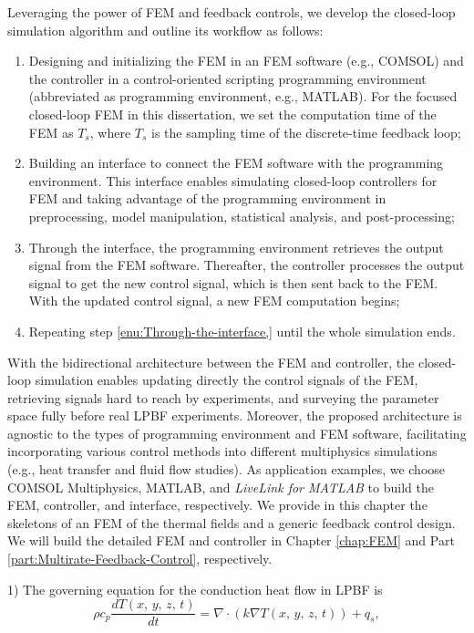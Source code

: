 \documentclass [11pt, proquest] {uwthesis}[2020/02/24]
\begin{document}
Leveraging the power of FEM and feedback controls, we develop the
closed-loop simulation algorithm and outline its workflow as follows:
\begin{enumerate}
\item Designing and initializing the FEM in an FEM software (e.g., COMSOL) and the controller in a control-oriented scripting programming environment (abbreviated as programming 
environment, e.g., MATLAB). For the focused closed-loop FEM in this dissertation, we set the computation time of the FEM as $T_{s}$, where $T_{s}$ is the sampling time of the discrete-time feedback loop;
\item Building an interface to connect the FEM software with the programming
environment. This interface enables simulating closed-loop controllers
for FEM and taking advantage of the programming environment in preprocessing,
model manipulation, statistical analysis, and post-processing; 
\item \label{enu:Through-the-interface,}Through the interface, the programming
environment retrieves the output signal from the FEM software. Thereafter,
the controller processes the output signal to get the new control
signal, which is then sent back to the FEM. With the updated control
signal, a new FEM computation begins;
\item Repeating step \ref{enu:Through-the-interface,} until the whole simulation
ends.
\end{enumerate}
With the bidirectional architecture between the FEM and controller,
the closed-loop simulation enables updating directly the control signals
of the FEM, retrieving signals hard to reach by experiments, and surveying
the parameter space fully before real LPBF experiments. Moreover, the
proposed architecture is agnostic to the types of programming environment
and FEM software, facilitating incorporating various control methods
into different multiphysics simulations (e.g., heat transfer and fluid
flow studies). As application examples, we choose COMSOL Multiphysics,
MATLAB, and \emph{LiveLink for MATLAB} to build the FEM, controller,
and interface, respectively. We provide in this chapter the skeletons
of an FEM of the thermal fields and a generic feedback control design. We
will build the detailed FEM and controller in Chapter \ref{chap:FEM}
and Part \ref{part:Multirate-Feedback-Control}, respectively.

1) The governing equation for the conduction heat flow in LPBF is
\begin{equation}
\rho c_{p}\frac{dT(x,\,y,\,z,\,t)}{dt}=\nabla\cdot(k\nabla T(x,\,y,\,z,\,t))+q_{s},\label{eq:heat_conduction}
\end{equation}
\end{document}
